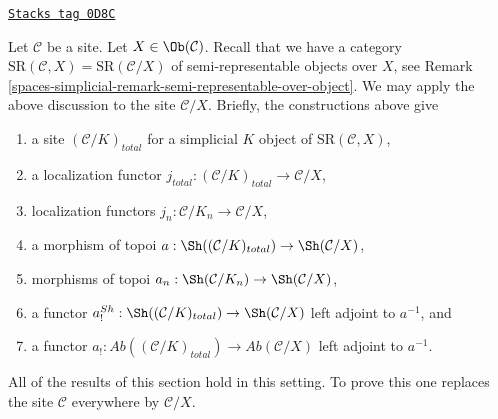 \begin{remark}

\label{spaces-simplicial-remark-augmentation-over-object}
\href{https://stacks.math.columbia.edu/tag/0D8C}{\texttt{Stacks tag 0D8C}}

Let $\mathcal{C}$ be a site. Let $X \in \Ob(\mathcal{C})$.
Recall that we have a category
$\text{SR}(\mathcal{C}, X) = \text{SR}(\mathcal{C}/X)$
of semi-representable objects over $X$,
see Remark \ref{spaces-simplicial-remark-semi-representable-over-object}.
We may apply the above discussion to the site
$\mathcal{C}/X$. Briefly, the constructions above give
\begin{enumerate}
\item a site $(\mathcal{C}/K)_{total}$ for a simplicial $K$ object
of $\text{SR}(\mathcal{C}, X)$,
\item a localization functor
$j_{total} : (\mathcal{C}/K)_{total} \to \mathcal{C}/X$,
\item localization functors $j_n : \mathcal{C}/K_n \to \mathcal{C}/X$,
\item a morphism of topoi
$a : \Sh((\mathcal{C}/K)_{total}) \to \Sh(\mathcal{C}/X)$,
\item morphisms of topoi
$a_n : \Sh(\mathcal{C}/K_n) \to \Sh(\mathcal{C}/X)$,
\item a functor
$a^{Sh}_! : \Sh((\mathcal{C}/K)_{total}) \to \Sh(\mathcal{C}/X)$
left adjoint to $a^{-1}$, and
\item a functor
$a_! : \textit{Ab}((\mathcal{C}/K)_{total}) \to \textit{Ab}(\mathcal{C}/X)$
left adjoint to $a^{-1}$.
\end{enumerate}
All of the results of this section hold in this setting.
To prove this one replaces
the site $\mathcal{C}$ everywhere by $\mathcal{C}/X$.
\end{remark}

